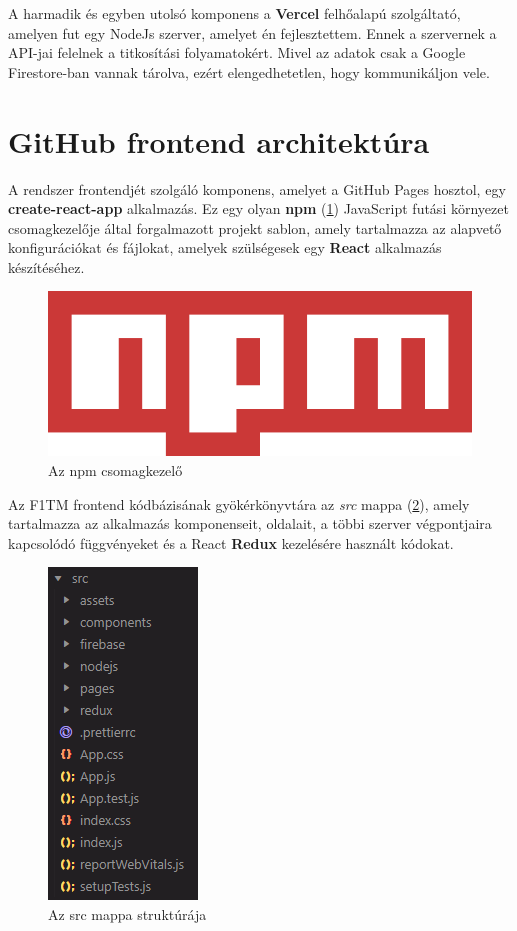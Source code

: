 A harmadik és egyben utolsó komponens a \textbf{Vercel} felhőalapú szolgáltató, amelyen fut egy NodeJs szerver, amelyet én fejlesztettem. Ennek a szervernek a API-jai felelnek a titkosítási folyamatokért. Mivel az adatok csak a {Google Firestore}-ban vannak tárolva, ezért elengedhetetlen, hogy kommunikáljon vele. 

\section {GitHub frontend architektúra} \label{frontend}

A rendszer frontendjét szolgáló komponens, amelyet a GitHub Pages hosztol, egy \textbf{create-react-app} alkalmazás. Ez egy olyan \textbf{npm} (\ref{abra:npmLogo}) JavaScript futási környezet csomagkezelője \cite{WikiNpm} által forgalmazott projekt sablon, amely tartalmazza az alapvető konfigurációkat és fájlokat, amelyek szülségesek egy \textbf{React} alkalmazás készítéséhez.

\begin{figure}[!h]
	\centering
	\includegraphics[scale=0.2]{images/npmLogo}
	\caption{Az npm csomagkezelő}
	\label{abra:npmLogo}
\end{figure}

Az F1TM frontend kódbázisának gyökérkönyvtára az \textit{src} mappa (\ref{abra:srcFolderStructure}), amely tartalmazza az alkalmazás komponenseit, oldalait, a többi szerver végpontjaira kapcsolódó függvényeket és a React \textbf{Redux} kezelésére használt kódokat.

\begin{figure}[!h]
	\centering
	\includegraphics[scale=0.6]{images/srcFolderStructure}
	\caption{Az src mappa struktúrája}
	\label{abra:srcFolderStructure}
\end{figure}

